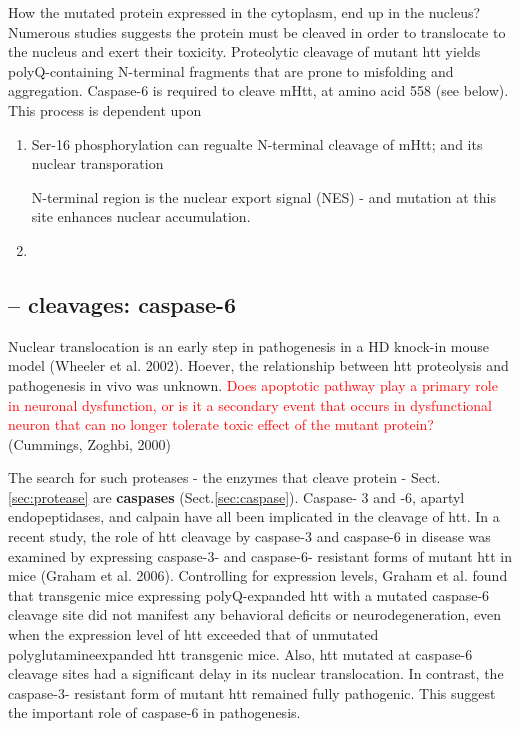 How the mutated protein expressed in the cytoplasm, end up in the nucleus?
Numerous studies suggests the protein must be cleaved in order to translocate to
the nucleus and exert their toxicity.
Proteolytic cleavage of mutant htt yields polyQ-containing N-terminal fragments
that are prone to misfolding and aggregation.
Caspase-6 is required to cleave mHtt, at amino acid 558 (see below).
This process is dependent upon
\begin{enumerate}
  \item Ser-16 phosphorylation can regualte N-terminal cleavage of mHtt; and its
  nuclear transporation

N-terminal region is the nuclear export signal (NES) - and mutation at this site
enhances nuclear accumulation.
  
  \item 
\end{enumerate}


\subsection{-- cleavages: caspase-6}
\label{sec:HD-}

Nuclear translocation is an early step in pathogenesis in a HD knock-in mouse
model (Wheeler et al. 2002). Hoever, the relationship between htt proteolysis
and pathogenesis in vivo was unknown.
\textcolor{red}{Does apoptotic pathway play a primary role in neuronal
dysfunction, or is it a secondary event that occurs in dysfunctional neuron that
can no longer tolerate toxic effect of the mutant protein?} (Cummings, Zoghbi,
2000)

The search for such proteases - the enzymes that cleave protein -
Sect.\ref{sec:protease} are {\bf caspases} (Sect.\ref{sec:caspase}).
Caspase- 3 and -6, apartyl endopeptidases, and calpain have all been implicated
in the cleavage of htt. In a recent study, the role of htt cleavage by caspase-3
and caspase-6 in disease was examined by expressing caspase-3- and caspase-6-
resistant forms of mutant htt in mice (Graham et al. 2006).
Controlling for expression levels, Graham et al. found that transgenic mice
expressing polyQ-expanded htt with a mutated caspase-6 cleavage site did not
manifest any behavioral deficits or neurodegeneration, even when the expression
level of htt exceeded that of unmutated polyglutamineexpanded htt transgenic
mice. Also, htt mutated at caspase-6 cleavage sites had a significant delay in
its nuclear translocation. In contrast, the caspase-3- resistant form of mutant
htt remained fully pathogenic. This suggest the important role of caspase-6 in
pathogenesis.

